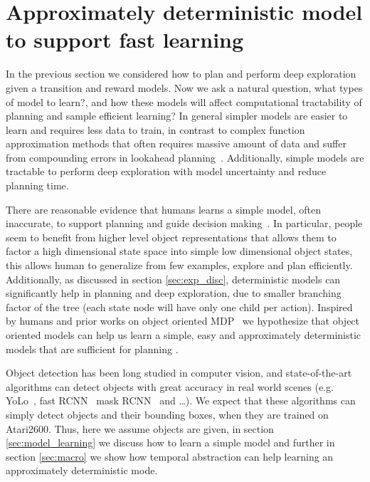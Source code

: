 \section{Approximately deterministic model to support fast learning}\label{sec:model}

In the previous section we considered how to plan and perform deep exploration given a transition and reward models. Now we ask a natural question, what types of model to learn?, and how these models will affect computational tractability of planning and sample efficient learning? In general simpler models are easier to learn and requires less data to train, in contrast to complex function approximation methods that often requires massive amount of data and suffer from compounding errors in lookahead planning~\citep{roderick2017deep, weber2017imagination}. Additionally, simple models are tractable to perform deep exploration with model uncertainty and reduce planning time.

There are reasonable evidence that humans learns a simple model, often inaccurate, to support planning and guide decision making~\citep{tsividis2017human, dubey2018investigating}. In particular, people seem to benefit from higher level object representations that allows them to factor a high dimensional state space into simple low dimensional object states, this allows human to generalize from few examples, explore and plan efficiently. 
Additionally, as discussed in section \ref{sec:exp_disc}, deterministic models can significantly help in planning and deep exploration, due to smaller branching factor of the tree (each state node will have only one child per action). Inspired by humans and prior works on object oriented MDP~\citep{diuk2008object} we hypothesize that object oriented models can help us learn a simple, easy and approximately deterministic models that are sufficient for planning .

Object detection has been long studied in computer vision, and state-of-the-art algorithms can detect objects with great accuracy in real world scenes (e.g. YoLo~\citep{redmon2017yolo9000}, fast RCNN~\citep{girshick2015fast} mask RCNN~\citep{he2017mask} and \dots). We expect that these algorithms can simply detect objects and their bounding boxes, when they are trained on Atari2600. Thus, here we assume objects are given, in section \ref{sec:model_learning} we discuss how to learn a simple model and further in section \ref{sec:macro} we show how temporal abstraction can help learning an approximately deterministic mode. 


